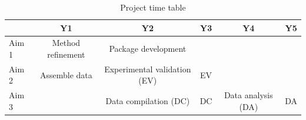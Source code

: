 \documentclass[12pt, class=article, crop=false]{standalone}
\begin{document}
\begin{table}
    \centering
    \caption{Project time table}
    \begin{tabular}{lccccc}
         & Y1 &  Y2 & Y3 & Y4 & Y5\\
         \hline
         Aim 1 & Method refinement & Package development & & & \\
         Aim 2 & Assemble data & Experimental validation (EV) & EV &  & \\
         Aim 3 & & Data compilation (DC) & DC & Data analysis (DA) & DA \\
    \end{tabular}
    \label{tab:tt}
\end{table}

\newpage

\renewcommand{\bibsection}{\section*{Bibliography \& References Cited}}

\end{document}
